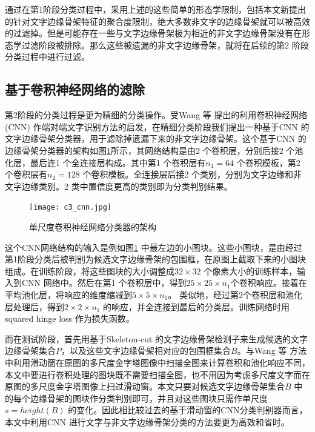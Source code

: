         通过在第1阶段分类过程中，采用上述的这些简单的形态学限制，包括本文新提出的针对文字边缘骨架特征的聚合度限制，绝大多数非文字的边缘骨架就可以被高效的过滤掉。但是可能存在一些与文字边缘骨架极为相近的非文字边缘骨架没有在形态学过滤阶段被排除。那么这些被遗漏的非文字边缘骨架，就将在后续的第2 阶段分类过程中进行过滤。

        \subsection{基于卷积神经网络的滤除}

        第2阶段的分类过程是更为精细的分类操作。受Wang 等\cite{Wang2012End} 提出的利用卷积神经网络(CNN) 作端对端文字识别方法的启发，在精细分类阶段我们提出一种基于CNN 的文字边缘骨架分类器，用于滤除掉遗漏下来的非文字边缘骨架。这个基于CNN 的边缘骨架分类器的架构如图\ref{fig.c3_cnn}所示，其网络结构是由2 个卷积层，分别后接2 个池化层，最后连1 个全连接层构成。其中第1 个卷积层有$n_1 = 64$ 个卷积模板，第2 个卷积层有$n_2 = 128$ 个卷积模板。全连接层后接2 个类别，分别为文字边缘和非文字边缘类别。2 类中置信度更高的类别即为分类判别结果。

        \begin{figure}[!h]
        \centering
        \texttt{[image: c3\_cnn.jpg]}
        \caption{单尺度卷积神经网络分类器的架构} \label{fig.c3_cnn}
        \end{figure}

        这个CNN网络结构的输入是例如图\ref{fig.c3_cnn} 中最左边的小图块。这些小图块，是由经过第1阶段分类后被判别为候选文字边缘骨架的包围框，在原图上截取下来的小图块组成。在训练阶段，将这些图块的大小调整成$32 \times 32$ 个像素大小的训练样本，输入到CNN 网络中。然后在第1 个卷积层中，得到$25 \times 25 \times n_1$个卷积响应。接着在平均池化层，将响应的维度缩减到$5 \times 5 \times n_1$。 类似地，经过第2个卷积层和池化层处理后，得到$2 \times 2\times n_1$ 的响应，并全连接到最后的分类层。训练网络时用squared hinge loss 作为损失函数。

        而在测试阶段，首先用基于Skeleton-cut 的文字边缘骨架检测子来生成候选的文字边缘骨架集合$P$，以及这些文字边缘骨架相对应的包围框集合$B$。与Wang 等\cite{Wang2012End} 方法中利用滑动窗在原图的多尺度金字塔图像中扫描全图来计算卷积和池化响应不同，本文中要进行卷积处理的图块既不需要扫描全图，也不用因为考虑多尺度文字而在原图的多尺度金字塔图像上扫过滑动窗。本文只要对候选文字边缘骨架集合$B$ 中的每个边缘骨架的图块作分类判别即可，并且对这些图块只需作单尺度$s = height(B)$ 的变化。因此相比较过去的基于滑动窗的CNN分类判别器而言，本文中利用CNN 进行文字与非文字边缘骨架分类的方法要更为高效和省时。


